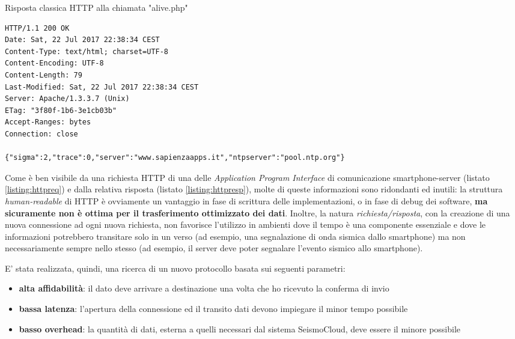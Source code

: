 \documentclass[a4paper,10pt]{memoir}
\begin{document}
\begin{listing}[h]
\caption{Risposta classica HTTP alla chiamata "alive.php"}
\label{listing:httpresp}
\begin{verbatim}
HTTP/1.1 200 OK
Date: Sat, 22 Jul 2017 22:38:34 CEST
Content-Type: text/html; charset=UTF-8
Content-Encoding: UTF-8
Content-Length: 79
Last-Modified: Sat, 22 Jul 2017 22:38:34 CEST
Server: Apache/1.3.3.7 (Unix)
ETag: "3f80f-1b6-3e1cb03b"
Accept-Ranges: bytes
Connection: close

{"sigma":2,"trace":0,"server":"www.sapienzaapps.it","ntpserver":"pool.ntp.org"}
\end{verbatim}
\end{listing}

Come è ben visibile da una richiesta HTTP di una delle \textit{Application Program Interface} di comunicazione smartphone-server (listato \ref{listing:httpreq}) e dalla relativa risposta (listato \ref{listing:httpresp}), molte di queste informazioni sono ridondanti ed inutili: la struttura \textit{human-readable} di HTTP è ovviamente un vantaggio in fase di scrittura delle implementazioni, o in fase di debug dei software, \textbf{ma sicuramente non è ottima per il trasferimento ottimizzato dei dati}. Inoltre, la natura \textit{richiesta/risposta}, con la creazione di una nuova connessione ad ogni nuova richiesta, non favorisce l'utilizzo in ambienti dove il tempo è una componente essenziale e dove le informazioni potrebbero transitare solo in un verso (ad esempio, una segnalazione di onda sismica dallo smartphone) ma non necessariamente sempre nello stesso (ad esempio, il server deve poter segnalare l'evento sismico allo smartphone).

\pagebreak

E' stata realizzata, quindi, una ricerca di un nuovo protocollo basata sui seguenti parametri:
\begin{itemize}
\item \textbf{alta affidabilità}: il dato deve arrivare a destinazione una volta che ho ricevuto la conferma di invio
\item \textbf{bassa latenza}: l'apertura della connessione ed il transito dati devono impiegare il minor tempo possibile
\item \textbf{basso overhead}: la quantità di dati, esterna a quelli necessari dal sistema SeismoCloud, deve essere il minore possibile
\end{itemize}
\end{document}
